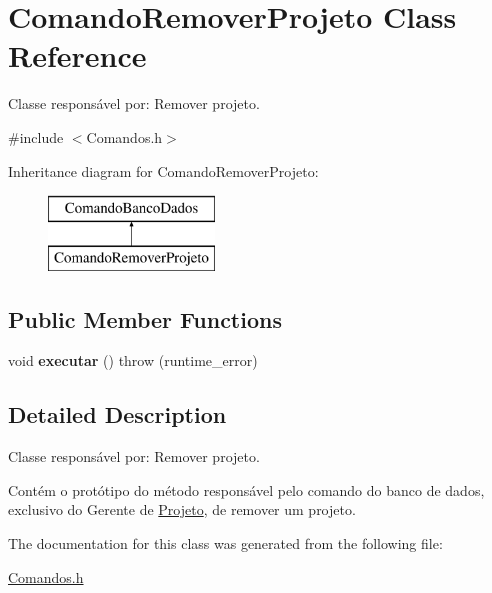 \hypertarget{class_comando_remover_projeto}{}\section{Comando\+Remover\+Projeto Class Reference}
\label{class_comando_remover_projeto}


Classe responsável por\+: Remover projeto.  




{\ttfamily \#include $<$Comandos.\+h$>$}

Inheritance diagram for Comando\+Remover\+Projeto\+:\begin{figure}[H]
\begin{center}
\leavevmode
\includegraphics[height=2.000000cm]{class_comando_remover_projeto}
\end{center}
\end{figure}
\subsection*{Public Member Functions}
\begin{DoxyCompactItemize}
\item 
\hypertarget{class_comando_remover_projeto_a1eae6e7aa009522f481273874145b638}{}\label{class_comando_remover_projeto_a1eae6e7aa009522f481273874145b638} 
void {\bfseries executar} ()  throw (runtime\+\_\+error)
\end{DoxyCompactItemize}


\subsection{Detailed Description}
Classe responsável por\+: Remover projeto. 

Contém o protótipo do método responsável pelo comando do banco de dados, exclusivo do Gerente de \hyperlink{class_projeto}{Projeto}, de remover um projeto. 

The documentation for this class was generated from the following file\+:\begin{DoxyCompactItemize}
\item 
\hyperlink{_comandos_8h}{Comandos.\+h}\end{DoxyCompactItemize}
